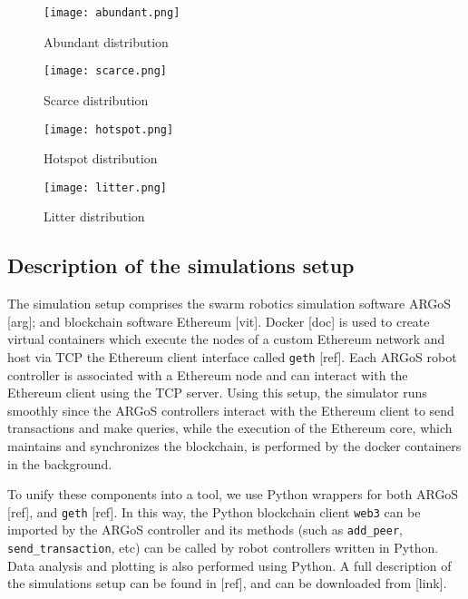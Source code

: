 \documentclass[runningheads]{llncs}
\begin{document}
\begin{figure}
\centering
\begin{minipage}{.495\textwidth}
  \centering
  \texttt{[image: abundant.png]}
  \caption{Abundant distribution}
  \label{fig:abundant}
\end{minipage}
\begin{minipage}{.495\textwidth}
  \centering
  \texttt{[image: scarce.png]}
  \caption{Scarce distribution}
  \label{fig:scarce}
\end{minipage}
\end{figure}

\begin{figure}
\centering
\begin{minipage}{.495\textwidth}
  \centering
  \texttt{[image: hotspot.png]}
  \caption{Hotspot distribution}
  \label{fig:hotspot}
\end{minipage}
\begin{minipage}{.495\textwidth}
  \centering
  \texttt{[image: litter.png]}
  \caption{Litter distribution}
  \label{fig:litter}
\end{minipage}
\end{figure}

\subsection{Description of the simulations setup}

The simulation setup comprises the swarm robotics simulation software ARGoS [arg]; and blockchain software Ethereum [vit]. Docker [doc] is used to create virtual containers which execute the nodes of a custom Ethereum network and host via TCP the Ethereum client interface called \texttt{geth} [ref]. Each ARGoS robot controller is associated with a Ethereum node and can interact with the Ethereum client using the TCP server.
Using this setup, the simulator runs smoothly since the ARGoS controllers interact with the Ethereum client to send transactions and make queries, while the execution of the Ethereum core, which maintains and synchronizes the blockchain, is performed by the docker containers in the background.
 
 To unify these components into a tool, we use Python wrappers for both ARGoS [ref], and \texttt{geth} [ref]. In this way, the Python blockchain client \texttt{web3} can be imported by the ARGoS controller and its methods (such as \texttt{add\_peer}, \texttt{send\_transaction}, etc) can be called by robot controllers written in Python. Data analysis and plotting is also performed using Python. A full description of the simulations setup can be found in [ref], and can be downloaded from [link].
\end{document}
